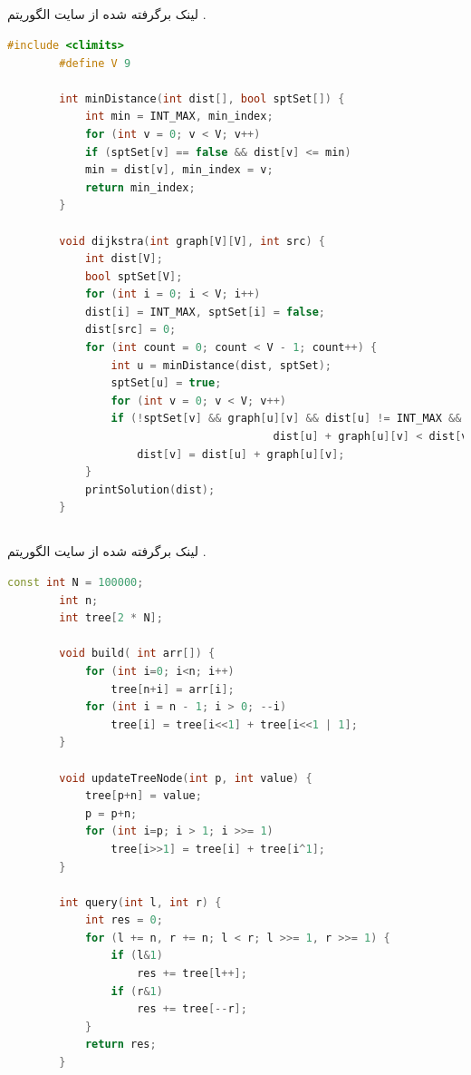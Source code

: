 \documentclass[a4paper,12pt]{report}
\begin{document}
	\subsection{}\label{subsec1:sec1:chap1}
	لینک برگرفته شده از سایت
	\hyperref{https://www.geeksforgeeks.org}{algorithmSite}{geeksforgeeks}{}
	الگوریتم
	\hyperref{https://www.geeksforgeeks.org/dijkstras-shortest-path-algorithm-greedy-algo-7/}{DijkstraAlgorithm}{geeksforgeeks}
	{}.
	\cite{Geeksfor41:online}


	\begin{latin}
		\small
		\begin{lstlisting}[language=C++]
		#include <climits>
		#define V 9

		int minDistance(int dist[], bool sptSet[]) {
			int min = INT_MAX, min_index;
			for (int v = 0; v < V; v++)
			if (sptSet[v] == false && dist[v] <= min)
			min = dist[v], min_index = v;
			return min_index;
		}

		void dijkstra(int graph[V][V], int src) {
			int dist[V];
			bool sptSet[V];
			for (int i = 0; i < V; i++)
			dist[i] = INT_MAX, sptSet[i] = false;
			dist[src] = 0;
			for (int count = 0; count < V - 1; count++) {
				int u = minDistance(dist, sptSet);
				sptSet[u] = true;
				for (int v = 0; v < V; v++)
				if (!sptSet[v] && graph[u][v] && dist[u] != INT_MAX &&
										 dist[u] + graph[u][v] < dist[v])
					dist[v] = dist[u] + graph[u][v];
			}
			printSolution(dist);
		}
		\end{lstlisting}
	\end{latin}

	\subsection{}\label{subsec2:sec1:chap1}

	لینک برگرفته شده از سایت
	\hyperref{https://www.geeksforgeeks.org}{algorithmSite}{geeksforgeeks}{}
	الگوریتم
	\hyperref{https://www.geeksforgeeks.org/segment-tree-efficient-implementation/}{Segment tree}{geeksforgeeks}
	{}.
	\cite{Geeksfor41:online}
	\begin{latin}
		\small
		\begin{lstlisting}[language=C++]
		const int N = 100000;
		int n;
		int tree[2 * N];

		void build( int arr[]) {
			for (int i=0; i<n; i++)
				tree[n+i] = arr[i];
			for (int i = n - 1; i > 0; --i)
				tree[i] = tree[i<<1] + tree[i<<1 | 1];
		}

		void updateTreeNode(int p, int value) {
			tree[p+n] = value;
			p = p+n;
			for (int i=p; i > 1; i >>= 1)
				tree[i>>1] = tree[i] + tree[i^1];
		}

		int query(int l, int r) {
			int res = 0;
			for (l += n, r += n; l < r; l >>= 1, r >>= 1) {
				if (l&1)
					res += tree[l++];
				if (r&1)
					res += tree[--r];
			}
			return res;
		}
		\end{lstlisting}
	\end{latin}
\end{document}
